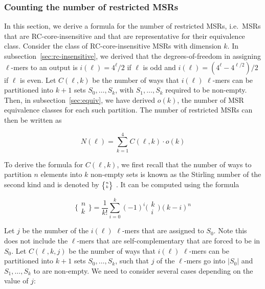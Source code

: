 \documentclass[
  11,
]{scrbook}
\begin{document}
\hypertarget{counting-the-number-of-restricted-msrs}{%
\subsubsection{Counting the number of restricted MSRs}\label{counting-the-number-of-restricted-msrs}}

In this section, we derive a formula for the number of restricted MSRs,
i.e.~MSRs that are RC-core-insensitive and that are representative for
their equivalence class. Consider the class of RC-core-insensitive MSRs
with dimension \(k\). In
subsection~\ref{sec:rc-insensitive}, we derived that the degrees-of-freedom
in assigning \(\ell\)-mers to an output is \(i(\ell) = 4^\ell/2\) if \(\ell\)
is odd and \(i(\ell) = (4^\ell - 4^{\ell / 2})/2\) if \(\ell\) is even. Let
\(C(\ell,k)\) be the number of ways that \(i(\ell)\) \(\ell\)-mers can be
partitioned into \(k+1\) sets \(S_0, \ldots, S_k\), with \(S_1, \ldots, S_k\)
required to be non-empty. Then, in
subsection~\ref{sec:equiv}, we have derived \(o(k)\), the number of MSR
equivalence classes for each such partition. The number of restricted
MSRs can then be written as

\begin{equation}
N(\ell) = \sum_{k=1}^{4} C(\ell, k) \cdot o(k)
\label{eq:N}
\end{equation}

To derive the formula for \(C(\ell, k)\), we first recall that the number
of ways to partition \(n\) elements into \(k\) non-empty sets is known as
the Stirling number of the second kind and is denoted by
\(\tiny\bigg\{%
\begin{matrix}
    n \\
    k
\end{matrix}
\bigg\} \) \autocite[ p.265]{grahamConcreteMathematicsFoundation1994}. It can
be computed using the formula

\begin{equation*}
    \bigg\{%
\begin{matrix}
    n \\
    k
\end{matrix}
\bigg\}  = \frac{1}{k!}\sum_{i=0}^k(-1)^i\bigg(
\begin{matrix}
    k \\
    i
\end{matrix}
\bigg) (k-i)^n
\end{equation*}

Let \(j\) be the number of the \(i(\ell)\) \(\ell\)-mers that are assigned to
\(S_0\). Note this does not include the \(\ell\)-mers that are
self-complementary that are forced to be in \(S_0\). Let \(C(\ell,k,j)\) be
the number of ways that \(i(\ell)\) \(\ell\)-mers can be partitioned into
\(k+1\) sets \(S_0, \ldots, S_k\), such that \(j\) of the \(\ell\)-mers go into
\(|S_0|\) and \(S_1, \ldots, S_k\) to are non-empty. We need to consider
several cases depending on the value of \(j\):
\end{document}
